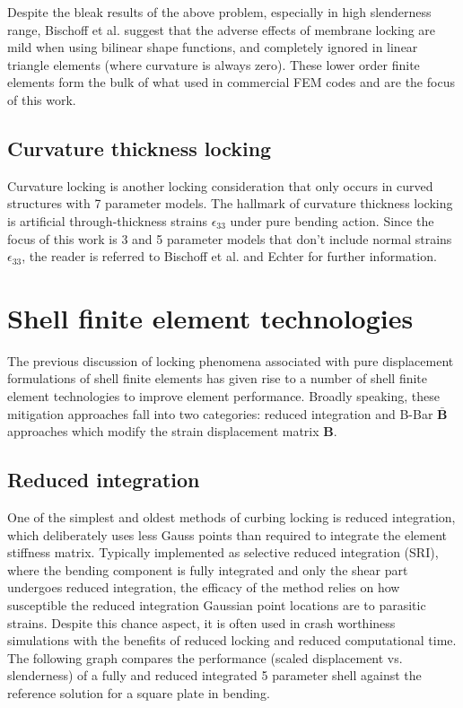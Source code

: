 Despite the bleak results of the above problem, especially in high slenderness range, Bischoff et al. \cite{BischLitBook04} suggest that the adverse effects of membrane locking are mild when using bilinear shape functions, and completely ignored in linear triangle elements (where curvature is always zero). These lower order finite elements form the bulk of what used in commercial FEM codes and are the focus of this work.

\subsection{Curvature thickness locking}

Curvature locking is another locking consideration that only occurs in curved structures with 7 parameter models. The hallmark of curvature thickness locking is artificial through-thickness strains $\epsilon_{33}$ under pure bending action. Since the focus of this work is 3 and 5 parameter models that don't include normal strains $\epsilon_{33}$, the reader is referred to Bischoff et al. \cite{BischLitBook04} and Echter \cite{Echter13} for further information.





\section{Shell finite element technologies}

The previous discussion of locking phenomena associated with pure displacement formulations of shell finite elements has given rise to a number of shell finite element technologies to improve element performance. Broadly speaking, these mitigation approaches fall into two categories: reduced integration and B-Bar $\bar{\mathbf{B}}$ approaches which modify the strain displacement matrix $\mathbf{B}$. 

\subsection{Reduced integration}

One of the simplest and oldest methods of curbing locking is reduced integration, which deliberately uses less Gauss points than required to integrate the element stiffness matrix. Typically implemented as selective reduced integration (SRI), where the bending component is fully integrated and only the shear part undergoes reduced integration, the efficacy of the method relies on how susceptible the reduced integration Gaussian point locations are to parasitic strains. Despite this chance aspect, it is often used in crash worthiness simulations with the benefits of reduced locking and reduced computational time. The following graph compares the performance (scaled displacement vs. slenderness) of a fully and reduced integrated 5 parameter shell against the reference solution for a square plate in bending.

